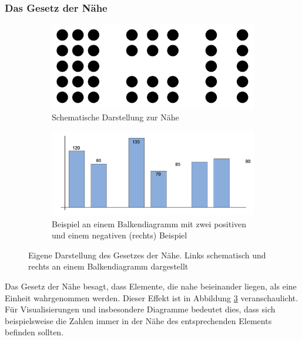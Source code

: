 \subsubsection{Das Gesetz der Nähe}
\begin{figure}[ht]
\begin{subfigure}{.5\linewidth}
  \centering
  \includegraphics[width=.95\linewidth]{img/gNaehe}  
  \caption{Schematische Darstellung zur Nähe}
  \label{fig:naeheSchema}
\end{subfigure}
\begin{subfigure}{.5\linewidth}
  \centering
  \includegraphics[width=.95\linewidth]{img/gNaeheDia}  
  \caption{Beispiel an einem Balkendiagramm mit zwei positiven und einem negativen (rechts) Beispiel}
  \label{fig:naeheDia}
\end{subfigure}
\caption[Gesetz der Nähe]{Eigene Darstellung des Gesetzes der Nähe. Links schematisch und rechts an einem Balkendiagramm dargestellt}
\label{fig:naehe}
\end{figure}

Das Gesetz der Nähe besagt, dass Elemente, die nahe beieinander liegen, als eine Einheit wahrgenommen werden.
Dieser Effekt ist in Abbildung \ref{fig:naehe} veranschaulicht.
Für Visualisierungen und insbesondere Diagramme bedeutet dies, dass sich beispielsweise die Zahlen immer in der Nähe des entsprechenden Elements befinden sollten.

